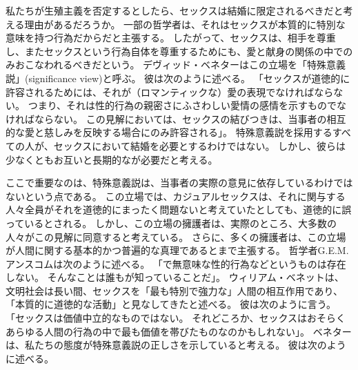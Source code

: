 \documentclass[paper=a4,book,openany]{jlreq}
\begin{document}
私たちが生殖主義を否定するとしたら、セックスは結婚に限定されるべきだと考える理由があるだろうか。
一部の哲学者は、それはセックスが本質的に特別な意味を持つ行為だからだと主張する。
したがって、セックスは、相手を尊重し、またセックスという行為自体を尊重するためにも、愛と献身の関係の中でのみおこなわれるべきだという。
デヴィッド・ベネターはこの立場を「特殊意義説」(significance view)と呼ぶ。
彼は次のように述べる。
「セックスが道徳的に許容されるためには、それが（ロマンティックな）愛の表現でなければならない。
つまり、それは性的行為の親密さにふさわしい愛情の感情を示すものでなければならない。
この見解においては、セックスの結びつきは、当事者の相互的な愛と慈しみを反映する場合にのみ許容される」\citep[p.182]{benatar02:_two_views_sexual_ethic}。
特殊意義説を採用するすべての人が、セックスにおいて結婚を必要とするわけではない。
しかし、彼らは少なくともお互いと長期的なが必要だと考える。

ここで重要なのは、特殊意義説は、当事者の実際の意見に依存しているわけではないという点である。
この立場では、カジュアルセックスは、それに関与する人々全員がそれを道徳的にまったく問題ないと考えていたとしても、道徳的に誤っているとされる。
しかし、この立場の擁護者は、実際のところ、大多数の人々がこの見解に同意すると考えている。
さらに、多くの擁護者は、この立場が人間に関する基本的かつ普遍的な真理であるとまで主張する。
哲学者G.E.M. アンスコムは次のように述べる。
「で無意味な性的行為などというものは存在しない。
そんなことは誰もが知っていることだ」\citep{anscombe72contraception}。
ウィリアム・ベネットは、文明社会は長い間、セックスを「最も特別で強力な」人間の相互作用であり、「本質的に道徳的な活動」と見なしてきたと述べる。
彼は次のように言う。
「セックスは価値中立的なものではない。
それどころか、セックスはおそらくあらゆる人間の行為の中で最も価値を帯びたものなのかもしれない」\citep[p.19]{bennett98:_death_outrag}。
ベネターは、私たちの態度が特殊意義説の正しさを示していると考える。
彼は次のように述べる。
\end{document}
